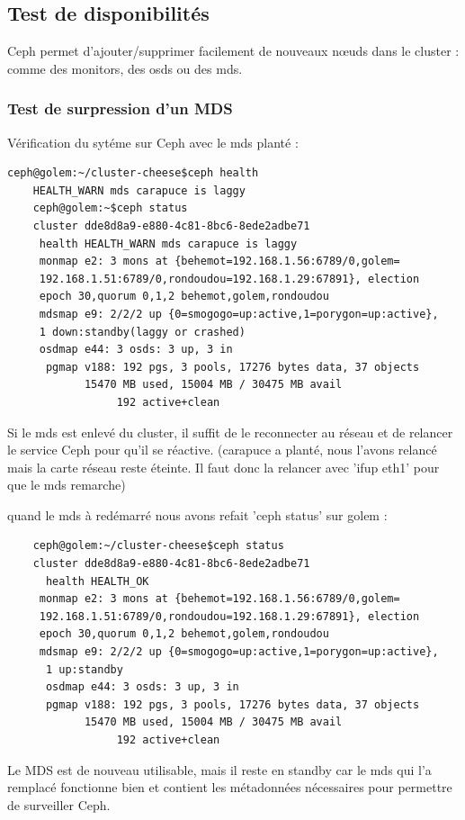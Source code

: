 \documentclass[12pt]{article}
\begin{document}
	\subsection{Test de disponibilités}
	Ceph permet d'ajouter/supprimer facilement de nouveaux nœuds dans le cluster : comme des monitors, des osds ou des mds.

	\subsubsection{Test de surpression d'un MDS}
	Vérification du sytéme sur Ceph avec le mds planté :
\begin{verbatim}
ceph@golem:~/cluster-cheese$ceph health 
    HEALTH_WARN mds carapuce is laggy  
    ceph@golem:~$ceph status     
    cluster dde8d8a9-e880-4c81-8bc6-8ede2adbe71
     health HEALTH_WARN mds carapuce is laggy 
     monmap e2: 3 mons at {behemot=192.168.1.56:6789/0,golem=
     192.168.1.51:6789/0,rondoudou=192.168.1.29:67891}, election 
     epoch 30,quorum 0,1,2 behemot,golem,rondoudou 
     mdsmap e9: 2/2/2 up {0=smogogo=up:active,1=porygon=up:active}, 
     1 down:standby(laggy or crashed)
     osdmap e44: 3 osds: 3 up, 3 in 
      pgmap v188: 192 pgs, 3 pools, 17276 bytes data, 37 objects 
            15470 MB used, 15004 MB / 30475 MB avail 
                 192 active+clean 
\end{verbatim}
	Si le mds est enlevé du cluster, il suffit de le reconnecter au réseau et de relancer le service Ceph pour qu'il se réactive.
(carapuce a planté, nous l'avons relancé mais la carte réseau reste éteinte. Il faut donc la relancer avec 'ifup eth1' pour que le mds remarche)

quand le mds à redémarré nous avons refait 'ceph status' sur golem :
\begin{verbatim}
    ceph@golem:~/cluster-cheese$ceph status     
    cluster dde8d8a9-e880-4c81-8bc6-8ede2adbe71
      health HEALTH_OK  
     monmap e2: 3 mons at {behemot=192.168.1.56:6789/0,golem=
     192.168.1.51:6789/0,rondoudou=192.168.1.29:67891}, election 
     epoch 30,quorum 0,1,2 behemot,golem,rondoudou 
     mdsmap e9: 2/2/2 up {0=smogogo=up:active,1=porygon=up:active},
      1 up:standby
      osdmap e44: 3 osds: 3 up, 3 in 
      pgmap v188: 192 pgs, 3 pools, 17276 bytes data, 37 objects 
            15470 MB used, 15004 MB / 30475 MB avail 
                 192 active+clean 
\end{verbatim}

Le MDS est de nouveau utilisable, mais il reste en standby car le mds qui l'a remplacé fonctionne bien et contient les métadonnées nécessaires pour permettre de surveiller Ceph.
\end{document}
